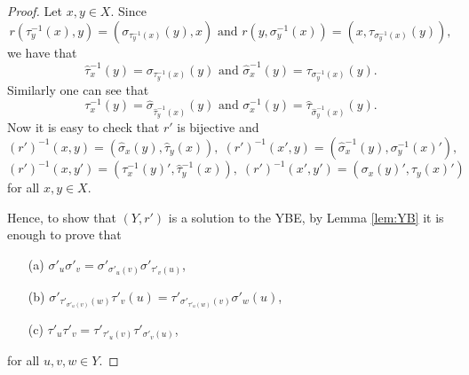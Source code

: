 \begin{proof}
Let $x,y\in X$. Since 
\[ r(\tau^{-1}_y(x),y)=(\sigma_{\tau^{-1}_y(x)}(y),x) \text{ and }
r(y,\sigma^{-1}_y(x))=(x,\tau_{\sigma^{-1}_y(x)}(y)),\] we have that
\[ \widehat{\tau}^{-1}_x(y)=\sigma_{\tau^{-1}_y(x)}(y)\text{ and } \widehat{\sigma}^{-1}_x(y)=\tau_{\sigma^{-1}_y(x)}(y).\]
Similarly one can see that
\[ \tau^{-1}_x(y)=\widehat{\sigma}_{\widehat{\tau}^{-1}_y(x)}(y)\text{ and } \sigma^{-1}_x(y)=\widehat{\tau}_{\widehat{\sigma}^{-1}_y(x)}(y).\]
Now it is easy to check that $r'$ is bijective and
\[ (r')^{-1}(x,y)=(\widehat{\sigma}_x(y),\widehat{\tau}_y(x)),\; (r')^{-1}(x',y)=(\widehat{\sigma}^{-1}_x(y),\sigma^{-1}_y(x)'),\] 
\[ (r')^{-1}(x,y')=(\tau^{-1}_x(y)',\widehat{\tau}^{-1}_y(x)), \; (r')^{-1}(x',y')=(\sigma_x(y)',\tau_y(x)')\]
for all $x,y\in X$.

Hence, to show that $(Y,r')$ is a solution to the YBE,  
by Lemma \ref{lem:YB} it is enough to prove that
\begin{itemize}
    \item[(a)] $\sigma'_{u}\sigma'_{v}=\sigma'_{\sigma'_u(v)}\sigma'_{\tau'_v(u)}$,
    \item[(b)]$\sigma'_{\tau'_{\sigma'_u(v)}(w)}\tau'_v(u)=\tau'_{\sigma'_{\tau'_u(w)}(v)}\sigma'_w(u)$,
    \item[(c)] $\tau'_{u}\tau'_{v}=\tau'_{\tau'_u(v)}\tau'_{\sigma'_v(u)}$,
\end{itemize}
for all $u,v,w\in Y$.


\end{proof}
